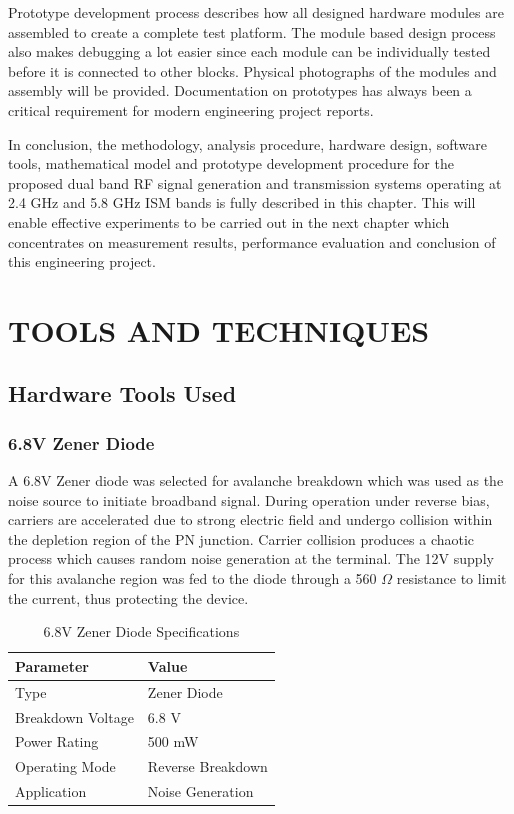 \documentclass[12pt,a4paper]{report}
\begin{document}
	\vspace{0.5\baselineskip}
	
	Prototype development process describes how all designed hardware modules are assembled to create a complete test platform. The module based design process also makes debugging a lot easier since each module can be individually tested before it is connected to other blocks. Physical photographs of the modules and assembly will be provided. Documentation on prototypes has always been a critical requirement for modern engineering project reports.
	
	\vspace{0.5\baselineskip}
	
	In conclusion, the methodology, analysis procedure, hardware design, software tools, mathematical model and prototype development procedure for the proposed dual band RF signal generation and transmission systems operating at 2.4 GHz and 5.8 GHz ISM bands is fully described in this chapter. This will enable effective experiments to be carried out in the next chapter which concentrates on measurement results, performance evaluation and conclusion of this engineering project.
	
\chapter{TOOLS AND TECHNIQUES}

\section{Hardware Tools Used}

\subsection{6.8V Zener Diode}

A 6.8V Zener diode was selected for avalanche breakdown which was used as the noise source to initiate broadband signal. During operation under reverse bias, carriers are accelerated due to strong electric field and undergo collision within the depletion region of the PN junction. Carrier collision produces a chaotic process which causes random noise generation at the terminal. The 12V supply for this avalanche region was fed to the diode through a 560 $\Omega$ resistance to limit the current, thus protecting the device.

\begin{table}[H]
	\centering
	\caption{6.8V Zener Diode Specifications}
	\label{tab:zener}
	\begin{tabular}{p{5cm} p{5cm}}
		\toprule
		\textbf{Parameter} & \textbf{Value} \\
		\midrule
		Type & Zener Diode \\
		Breakdown Voltage & 6.8 V \\
		Power Rating & 500 mW \\
		Operating Mode & Reverse Breakdown \\
		Application & Noise Generation \\
		\bottomrule
	\end{tabular}
\end{table}
\end{document}
